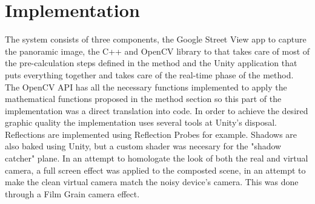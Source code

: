 \section{Implementation}
The system consists of three components, the Google Street View app to capture the panoramic image, the C++ and OpenCV library to that takes care of most of the pre-calculation steps defined in the method and the Unity application that puts everything together and takes care of the real-time phase of the method. \newline
The OpenCV API has all the necessary functions implemented to apply the mathematical functions proposed in the method section so this part of the implementation was a direct translation into code. In order to achieve the desired graphic quality the implementation uses several tools at Unity's disposal. Reflections are implemented using Reflection Probes for example. Shadows are also baked using Unity, but a custom shader was necesary for the "shadow catcher" plane.\newline
In an attempt to homologate the look of both the real and virtual camera, a full screen effect was applied to the composted scene, in an attempt to make the clean virtual camera match the noisy device's camera. This was done through a Film Grain camera effect.